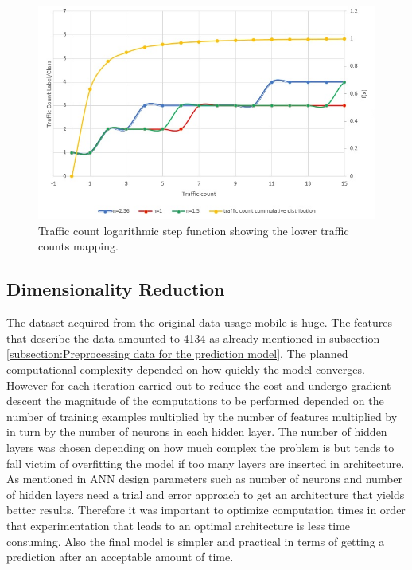 \documentclass[12pt, a4paper]{report}
\theoremstyle{definition}
\theoremstyle{definition}%
\theoremstyle{definition}%
\theoremstyle{definition}%
\theoremstyle{definition}%
\theoremstyle{definition}%
\begin{document}
\begin{figure}[!]	
	\includegraphics[scale=0.60]{steps_function_zoom_in.jpg}
	\centering
	\caption{Traffic count logarithmic step function showing the lower traffic counts mapping. }
	\label{fig:label_classification_of_traffic_count_zoom_in}
\end{figure}


\subsection{Dimensionality Reduction}
The dataset acquired from the original data usage mobile is huge. The features that describe the data amounted to 4134 as already mentioned in subsection \ref{subsection:Preprocessing data for the prediction model}. The planned computational complexity depended on how quickly the model converges. However for each iteration carried out to reduce the cost and undergo gradient descent the magnitude of the computations to be performed depended on the number of training examples multiplied by the number of features multiplied by in turn by the number of neurons in each hidden layer. The number of hidden layers was chosen depending on how much complex the problem is but tends to fall victim of overfitting the model if too many layers are inserted in architecture. As mentioned in \cite{Jain1996} ANN design parameters such as number of neurons and number of hidden layers need a trial and error approach to get an architecture that yields better results. Therefore it was important to optimize computation times in order that experimentation that leads to an optimal architecture is less time consuming. Also the final model is simpler and practical in terms of getting a prediction after an acceptable amount of time.
\end{document}
